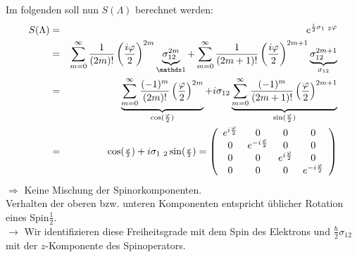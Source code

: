 \begin{enumerate}
Im folgenden soll nun $S(\Lambda)$ berechnet werden:
\begin{eqnarray*}
S(\Lambda) \g e^{\frac i 2 \sigma_{1 \ 2}\varphi}\\
\g \sum \limits_{m = 0}^{\infty} \frac 1 {(2m)!}\left (\frac{i\varphi}2\ri)^{2m}\underbrace{\sigma_{1 2}^{2m}}_{\mathds 1} + 
\sum \limits_{m = 0}^{\infty} \frac 1 {(2m + 1)!}\left( \frac{i\varphi}2\ri)^{2m + 1}\underbrace{\sigma_{1 2}^{2m + 1}}_{\sigma_{1 2}}\\
\g \underbrace{\sum \limits_{m = 0}^{\infty} \frac{(-1)^m}{(2m)!} \left( \frac{\varphi}2\ri)^{2m}}_{\cos({\scriptstyle\frac{\varphi}2})} + 
i \sigma_{1  2}\underbrace{\sum \limits_{m = 0}^{\infty} \frac{(-1)^m}{(2m+ 1)!} \left( \frac{\varphi}2\ri)^{2m+1}}_{\sin({\scriptstyle\frac{\varphi}2})}\\
\g \cos({\scriptstyle \frac{\varphi}2}) + i \sigma_{1\ 2} \sin({\scriptstyle\frac{\varphi}2}) =
\left( \begin{array}{cccc}e^{i\frac{\varphi}2}&0&0&0\\0&e^{-i\frac{\varphi}2}&0&0\\0&0&e^{i\frac{\varphi}2}&0\\0&0&0&e^{-i\frac{\varphi}2}\end{array}\ri)
\end{eqnarray*}
$\Rightarrow$ Keine Mischung der Spinorkomponenten.\\
Verhalten der oberen bzw. unteren Komponenten entspricht üblicher Rotation eines Spin$\frac 1 2$.\\
$\rightarrow$ Wir identifizieren diese Freiheitsgrade mit dem Spin des Elektrons und $\frac{\hbar}2 \sigma_{1  2}$ mit der $z$-Komponente des Spinoperators.


\end{enumerate}
